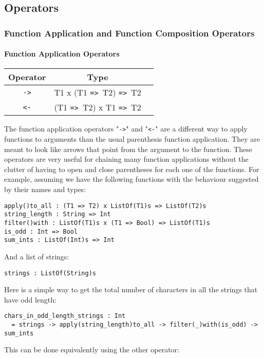 \documentclass{article}
\def\ra{\texttt{=>}\ }
\begin{document}
\subsection{Operators}

\subsubsection{Function Application and Function Composition Operators}

\paragraph{Function Application Operators}

\begin{center}
\begin{tabular}{ |c|c|c| } 
\hline
Operator & Type \\ 
\hline
\hline
\texttt{->} & T1 x (T1 \ra T2) \ra T2 \\
\hline
\texttt{<-} & (T1 \ra T2) x T1 \ra T2 \\
\hline
\end{tabular}
\end{center}
The function application operators "\texttt{->}" and "\texttt{<-}" are a
different way to apply functions to arguments than the usual parenthesis
function application.  They are meant to look like arrows that point from the
argument to the function.  These operators are very useful for chaining many
function applications without the clutter of having to open and close
parentheses for each one of the functions.  For example, assuming we have the
following functions with the behaviour suggested by their names and types:
\begin{verbatim}
apply()to_all : (T1 => T2) x ListOf(T1)s => ListOf(T2)s
string_length : String => Int
filter()with : ListOf(T1)s x (T1 => Bool) => ListOf(T1)s
is_odd : Int => Bool
sum_ints : ListOf(Int)s => Int
\end{verbatim}
And a list of strings:
\begin{verbatim}
strings : ListOf(String)s
\end{verbatim}
Here is a simple way to get the total number of characters in all the strings
that have odd length:
\begin{verbatim}
chars_in_odd_length_strings : Int
  = strings -> apply(string_length)to_all -> filter(_)with(is_odd) -> sum_ints
\end{verbatim}
This can be done equivalently using the other operator:
\end{document}
